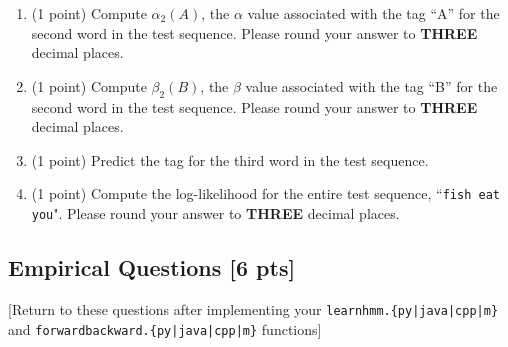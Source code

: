 \documentclass{article}
\begin{document}
\clearpage

\begin{enumerate}
    \item (1 point) Compute $\alpha_2(A)$, the $\alpha$ value associated with the tag ``A'' for the second word in the test sequence. Please round your answer to \textbf{THREE} decimal places.
    
    \begin{tcolorbox}[fit,height=1cm, width=2cm, blank, borderline={1pt}{-2pt}]
        \end{tcolorbox}
    

    \item (1 point) Compute $\beta_2(B)$, the $\beta$ value associated with the tag ``B'' for the second word in the test sequence. Please round your answer to \textbf{THREE} decimal places.
    
    \begin{tcolorbox}[fit,height=1cm, width=2cm, blank, borderline={1pt}{-2pt}]
        \end{tcolorbox}
    
    \item (1 point) Predict the tag for the third word in the test sequence. 
    
    \begin{tcolorbox}[fit,height=1cm, width=2cm, blank, borderline={1pt}{-2pt}]
        \end{tcolorbox}
    
    \item (1 point) Compute the log-likelihood for the entire test sequence, ``\texttt{fish eat you}". Please round your answer to \textbf{THREE} decimal places.
    
    \begin{tcolorbox}[fit,height=1cm, width=2cm, blank, borderline={1pt}{-2pt}]
        \end{tcolorbox}
    
\end{enumerate}




\clearpage

\subsection{Empirical Questions [6 pts]}
[Return to these questions after implementing your \texttt{learnhmm.\{py|java|cpp|m\}} and \texttt{forwardbackward.\{py|java|cpp|m\}} functions]
\end{document}
